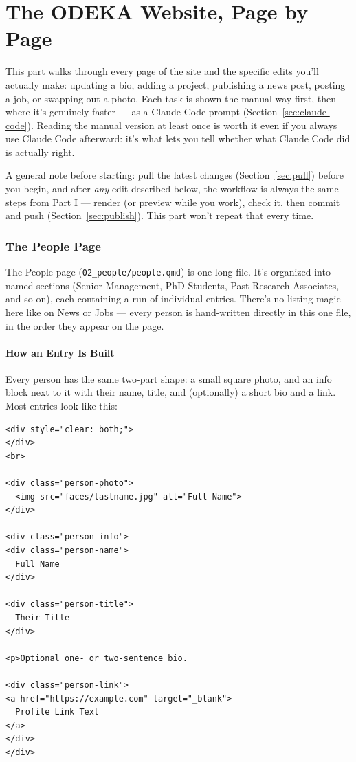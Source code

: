 \documentclass[11pt]{article}
\newcommand{\file}[1]{\texttt{#1}}
\begin{document}
\part{The ODEKA Website, Page by Page}

This part walks through every page of the site and the specific edits
you'll actually make: updating a bio, adding a project, publishing a
news post, posting a job, or swapping out a photo. Each task is shown
the manual way first, then --- where it's genuinely faster --- as a
Claude Code prompt (Section~\ref{sec:claude-code}). Reading the manual
version at least once is worth it even if you always use Claude Code
afterward: it's what lets you tell whether what Claude Code did is
actually right.

A general note before starting: pull the latest changes
(Section~\ref{sec:pull}) before you begin, and after \emph{any} edit
described below, the workflow is always the same steps from Part I ---
render (or preview while you work), check it, then commit and push
(Section~\ref{sec:publish}). This part won't repeat that every time.

\section{The People Page}
\label{sec:people-page}

The People page (\file{02\_people/people.qmd}) is one long file. It's
organized into named sections (Senior Management, PhD Students, Past
Research Associates, and so on), each containing a run of individual
entries. There's no listing magic here like on News or Jobs --- every
person is hand-written directly in this one file, in the order they
appear on the page.

\subsection{How an Entry Is Built}

Every person has the same two-part shape: a small square photo, and an
info block next to it with their name, title, and (optionally) a short
bio and a link. Most entries look like this:

\begin{lstlisting}
<div style="clear: both;">
</div>
<br>

<div class="person-photo">
  <img src="faces/lastname.jpg" alt="Full Name">
</div>

<div class="person-info">
<div class="person-name">
  Full Name
</div>

<div class="person-title">
  Their Title
</div>

<p>Optional one- or two-sentence bio.

<div class="person-link">
<a href="https://example.com" target="_blank">
  Profile Link Text
</a>
</div>
</div>
\end{lstlisting}
\end{document}
